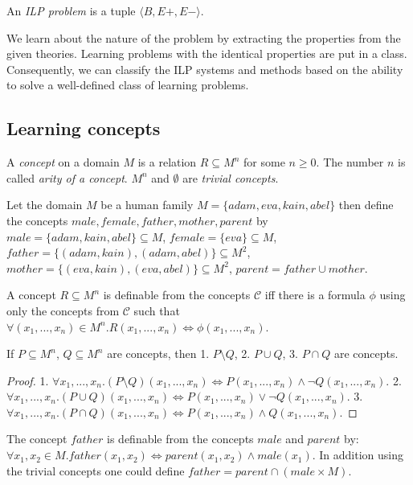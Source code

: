 \begin{defn}
An \emph{ILP problem} is a tuple $\langle B, E+, E- \rangle$.
\end{defn}

We learn about the nature of the problem by extracting the properties from the given theories. Learning problems with the identical properties are put in a class. Consequently, we can classify the ILP systems and methods based on the ability to solve a well-defined class of learning problems.

\subsection{Learning concepts}
\begin{defn}
A \emph{concept} on a domain $M$ is a relation $R \subseteq M^n$ for some $n \ge 0$.
The number $n$ is called \emph{arity of a concept}.
$M^n$ and $\emptyset$ are \emph{trivial concepts}.
\end{defn}

\begin{exmp}
Let the domain $M$ be a human family $M=\{adam, eva, kain, abel\}$ then define the concepts $male, female, father, mother, parent$ by
$male=\{adam, kain, abel\}\subseteq{M}$,
$female=\{eva\}\subseteq{M}$,
$father=\{(adam,kain), (adam,abel)\}\subseteq{M^2}$,
$mother=\{(eva,kain), (eva,abel)\}\subseteq{M^2}$,
$parent=father \cup mother$.
\end{exmp}
\begin{defn}
A concept $R\subseteq M^n$ is definable from the concepts $\mathcal{C}$ iff there is a formula $\phi$ using only the concepts from $\mathcal{C}$ such that
$\forall (x_1, ..., x_n) \in M^n. R(x_1, ..., x_n) \iff \phi(x_1, ..., x_n)$.
\end{defn}
\begin{corollary}
If $P\subseteq{M^n}$, $Q\subseteq{M^n}$ are concepts, then
1. $P \setminus Q$, 2. $P \cup Q$, 3. $P \cap Q$ are concepts.
\end{corollary}
\begin{proof}
1. $\forall x_1, ..., x_n. (P \setminus Q)(x_1, ..., x_n) \iff
P(x_1, ..., x_n) \land \neg Q(x_1, ..., x_n)$.
2. $\forall x_1, ..., x_n. (P \cup Q)(x_1, ..., x_n) \iff
P(x_1, ..., x_n) \lor \neg Q(x_1, ..., x_n)$.
3. $\forall x_1, ..., x_n. (P \cap Q)(x_1, ..., x_n) \iff
P(x_1, ..., x_n) \land Q(x_1, ..., x_n)$.
\end{proof}

\begin{exmp}
The concept $father$ is definable from the concepts $male$ and $parent$ by:
$\forall x_1, x_2 \in M. father(x_1, x_2) \iff parent(x_1, x_2) \land male(x_1)$. In addition using the trivial concepts one could define
$father=parent \cap (male \times M)$.
\end{exmp}

